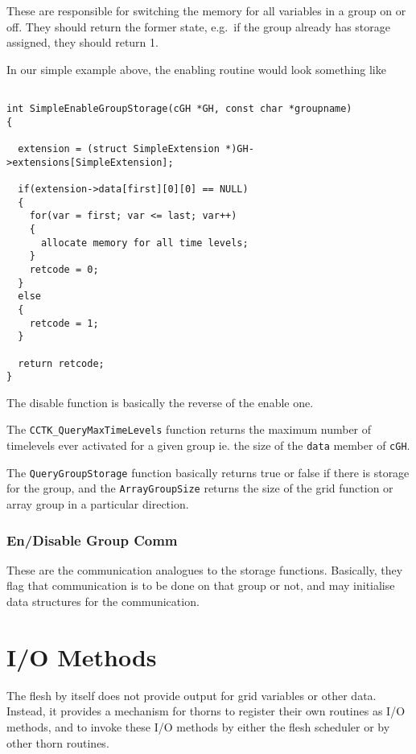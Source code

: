 These are responsible for switching the memory for all variables
in a group on or off.  They should return the former state, e.g.\
if the group already has storage assigned, they should return 1.

In our simple example above, the enabling routine would look
something like

\begin{verbatim}

int SimpleEnableGroupStorage(cGH *GH, const char *groupname)
{

  extension = (struct SimpleExtension *)GH->extensions[SimpleExtension];

  if(extension->data[first][0][0] == NULL)
  {
    for(var = first; var <= last; var++)
    {
      allocate memory for all time levels;
    }
    retcode = 0;
  }
  else
  {
    retcode = 1;
  }

  return retcode;
}

\end{verbatim}

The disable function is basically the reverse of the enable one.

The {\tt CCTK\_QueryMaxTimeLevels} function returns the maximum number of
timelevels ever activated for a given group ie. the size of the {\tt data}
member of {\tt cGH}.

The {\tt QueryGroupStorage} function basically returns true or false if
there is storage for the group, and the {\tt ArrayGroupSize} returns the
size of the grid function or array group in a particular direction.

\subsubsection{En/Disable Group Comm}

These are the communication analogues to the storage functions.  Basically,
they flag that communication is to be done on that group or not, and may
initialise data structures for the communication.


\section{I/O Methods}
\label{chap:io_methods}
%
The flesh by itself does not provide output for grid variables or other data.
Instead, it provides a mechanism for thorns to register their own
routines as I/O methods, and to invoke these I/O methods by either the
flesh scheduler or by other thorn routines.

